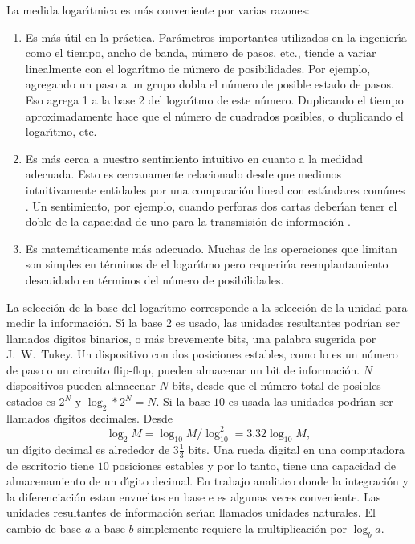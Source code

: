 La medida logar\'{\i}tmica es m\'{a}s conveniente por varias razones:
\begin{enumerate}
\item{Es m\'{a}s \'{u}til en la pr\'{a}ctica. Par\'{a}metros
  importantes utilizados en la ingenier\'{\i}a como el tiempo, ancho
  de banda, n\'{u}mero de pasos, etc., tiende a variar linealmente con
  el logar\'{\i}tmo de n\'{u}mero de posibilidades. Por ejemplo,
  agregando un paso a un grupo dobla el n\'{u}mero de posible estado
  de pasos. Eso agrega 1 a la base 2 del logar\'{\i}tmo de este
  n\'{u}mero. Duplicando el tiempo aproximadamente hace que el
  n\'{u}mero de cuadrados posibles, o duplicando el logar\'{\i}tmo,
  etc.}
\item{Es m\'{a}s cerca a nuestro sentimiento intuitivo en cuanto a la
  medidad adecuada. Esto es cercanamente relacionado desde que medimos
  intuitivamente entidades por una comparaci\'{o}n lineal con
  est\'{a}ndares com\'{u}nes \cite{Nyquist1,Nyquist2}. Un sentimiento,
  por ejemplo, cuando perforas dos cartas deber\'{\i}an tener el doble
  de la capacidad de uno para la transmisi\'{o}n de informaci\'{o}n
  \cite{Hartley}.}
\item{Es matem\'{a}ticamente m\'{a}s adecuado. Muchas de las
  operaciones que limitan son simples en t\'{e}rminos de el
  logar\'{\i}tmo pero requerir\'{\i}a reemplantamiento descuidado en
  t\'{e}rminos del n\'{u}mero de posibilidades.}
\end{enumerate}

La selecci\'{o}n de la base del logar\'{\i}tmo corresponde a la
selecci\'{o}n de la unidad para medir la informaci\'{o}n. S\'{\i} la
base 2 es usado, las unidades resultantes podr\'{\i}an ser llamados
digitos binarios, o m\'{a}s brevemente bits, una palabra sugerida por
J.\ W.\ Tukey. Un dispositivo con dos posiciones estables, como lo es
un n\'{u}mero de paso o un circuito flip-flop, pueden almacenar un bit
de informaci\'{o}n. $N$ dispositivos pueden almacenar $N$ bits, desde
que el n\'{u}mero total de posibles estados es $2^N$ y $\log_2 * 2^N =
N$. Si la base $10$ es usada las unidades podr\'{\i}an ser llamados
d\'{\i}gitos decimales. Desde
\begin{equation}
\log_2 M = \log_10 M / \log_10^2 = 3.32 \log_10 M,
\end{equation}
un d\'{\i}gito decimal es alrededor de $3 \frac{1}{3}$ bits. Una rueda
d\'{\i}gital en una computadora de escritorio tiene $10$ posiciones
estables y por lo tanto, tiene una capacidad de almacenamiento de un
d\'{\i}gito decimal. En trabajo analitico donde la integraci\'{o}n y
la diferenciaci\'{o}n estan envueltos en base e es algunas veces
conveniente. Las unidades resultantes de informaci\'{o}n ser\'{\i}an
llamados unidades naturales. El cambio de base $a$ a base $b$
simplemente requiere la multiplicaci\'{o}n por $\log_b a$.

